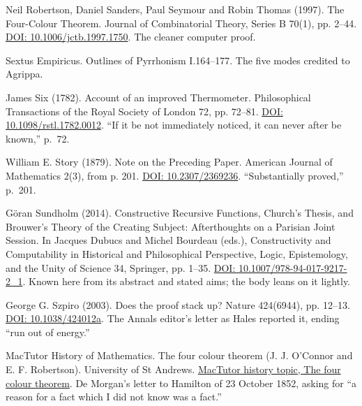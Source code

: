\documentclass[11pt,twoside]{article}
\theoremstyle{thielethm}
\theoremstyle{thieledef}
\theoremstyle{thieledef}
\theoremstyle{thieledef}
\theoremstyle{thielethm}
\theoremstyle{thieleobs}
\theoremstyle{thielethm}
\begin{document}
\noindent Neil Robertson, Daniel Sanders, Paul Seymour and Robin Thomas (1997). The Four-Colour Theorem. Journal of Combinatorial Theory, Series B 70(1), pp. 2--44. \href{https://doi.org/10.1006/jctb.1997.1750}{DOI: 10.1006/jctb.1997.1750}. The cleaner computer proof.
\par\medskip

\noindent Sextus Empiricus. Outlines of Pyrrhonism I.164--177. The five modes credited to Agrippa.
\par\medskip

\noindent James Six (1782). Account of an improved Thermometer. Philosophical Transactions of the Royal Society of London 72, pp. 72--81. \href{https://doi.org/10.1098/rstl.1782.0012}{DOI: 10.1098/rstl.1782.0012}. ``If it be not immediately noticed, it can never after be known,'' p.~72.
\par\medskip

\noindent William E. Story (1879). Note on the Preceding Paper. American Journal of Mathematics 2(3), from p. 201. \href{https://doi.org/10.2307/2369236}{DOI: 10.2307/2369236}. ``Substantially proved,'' p.~201.
\par\medskip

\noindent G\"oran Sundholm (2014). Constructive Recursive Functions, Church's Thesis, and Brouwer's Theory of the Creating Subject: Afterthoughts on a Parisian Joint Session. In Jacques Dubucs and Michel Bourdeau (eds.), Constructivity and Computability in Historical and Philosophical Perspective, Logic, Epistemology, and the Unity of Science 34, Springer, pp. 1--35. \href{https://doi.org/10.1007/978-94-017-9217-2_1}{DOI: 10.1007/978-94-017-9217-2\_1}. Known here from its abstract and stated aims; the body leans on it lightly.
\par\medskip

\noindent George G. Szpiro (2003). Does the proof stack up? Nature 424(6944), pp. 12--13. \href{https://doi.org/10.1038/424012a}{DOI: 10.1038/424012a}. The Annals editor's letter as Hales reported it, ending ``run out of energy.''
\par\medskip

\noindent MacTutor History of Mathematics. The four colour theorem (J. J. O'Connor and E. F. Robertson). University of St Andrews. \href{https://mathshistory.st-andrews.ac.uk/HistTopics/The_four_colour_theorem/}{MacTutor history topic, The four colour theorem}. De Morgan's letter to Hamilton of 23 October 1852, asking for ``a reason for a fact which I did not know was a fact.''
\par\medskip
\end{document}
